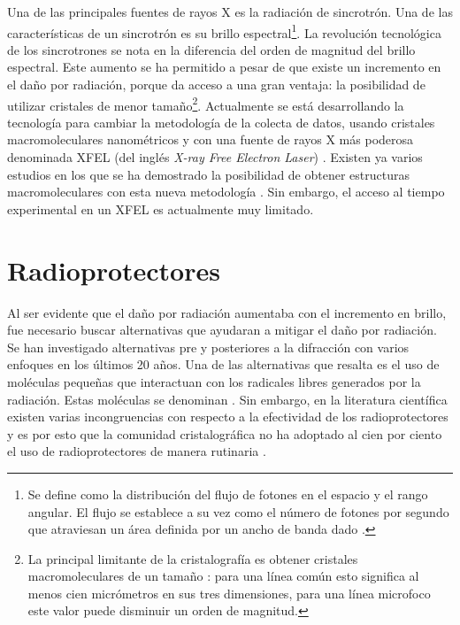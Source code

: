 Una de las principales fuentes de rayos X es la radiación de sincrotrón. Una de las características de un sincrotrón es su brillo espectral\footnote{Se define como la distribución del flujo de fotones en el espacio y el rango angular. El flujo se establece a su vez como el número de fotones por segundo que atraviesan un área definida por un ancho de banda dado \cite{Willmott2019}.}. La revolución tecnológica de los sincrotrones se nota en la diferencia del orden de magnitud del brillo espectral. Este aumento se ha permitido a pesar de que existe un incremento en el daño por radiación, porque da acceso a una gran ventaja: la posibilidad de utilizar cristales de menor tamaño\footnote{La principal limitante de la cristalografía es obtener cristales macromoleculares de un tamaño : para una línea común esto significa al menos cien micrómetros en sus tres dimensiones, para una línea microfoco este valor puede disminuir un orden de magnitud.}.  Actualmente se está desarrollando la tecnología para cambiar la metodología de la colecta de datos, usando cristales macromoleculares nanométricos y con una fuente de rayos X más poderosa denominada XFEL (del inglés \emph{X-ray Free Electron Laser}) \cite{Martin-Garcia2016}. Existen ya varios estudios en los que se ha demostrado la posibilidad de obtener estructuras macromoleculares con esta nueva metodología \cite{Martin-Garcia2016}. Sin embargo, el acceso al tiempo experimental en un XFEL es actualmente muy limitado.

\section{Radioprotectores}
Al ser evidente que el daño por radiación aumentaba con el incremento en brillo, fue necesario buscar alternativas que ayudaran a mitigar el daño por radiación. Se han investigado alternativas pre y posteriores a la difracción con varios enfoques en los últimos 20 años\cite{Garman2017}. Una de las alternativas que resalta es el uso de moléculas pequeñas que interactuan con los radicales libres generados por la radiación. Estas moléculas se denominan .  Sin embargo, en la literatura científica existen varias incongruencias con respecto a la efectividad de los radioprotectores y es por esto que la comunidad cristalográfica no ha adoptado al cien por ciento el uso de radioprotectores de manera rutinaria \cite{Nowak2009, Allan2013}.
